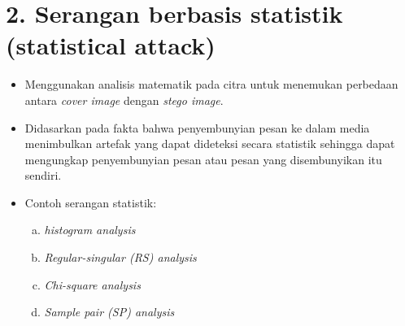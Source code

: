 \documentclass{article}
\begin{document}

\section*{2. Serangan berbasis statistik (statistical attack)}

\begin{itemize}
    \item Menggunakan analisis matematik pada citra untuk menemukan perbedaan antara \textit{cover image} dengan \textit{stego image}.
    \item Didasarkan pada fakta bahwa penyembunyian pesan ke dalam media menimbulkan artefak yang dapat dideteksi secara statistik sehingga dapat mengungkap penyembunyian pesan atau pesan yang disembunyikan itu sendiri.
    \item Contoh serangan statistik:
    \begin{enumerate}[a.]
        \item \textit{histogram analysis}
        \item \textit{Regular-singular (RS) analysis}
        \item \textit{Chi-square analysis}
        \item \textit{Sample pair (SP) analysis}
    \end{enumerate}
\end{itemize}
\end{document}
